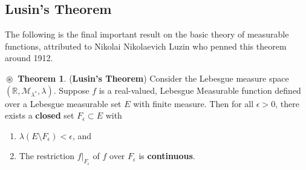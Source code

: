 \documentclass{article}
\theoremstyle{definition}
\newtheorem{theorem}{$\boxed{\boxed{\circledast}}$ Theorem}
\theoremstyle{remark}
\theoremstyle{definition}
\theoremstyle{definition}
\theoremstyle{definition}
\newcommand{\R}{\mathbb{R}}
\newcommand{\set}[1]{\mathscr{#1}}
\newcommand{\msigm}[1]{\set{M}_{#1}}
\newcommand{\lm}[1]{\lambda\left (#1\right )}
\newcommand{\restrict}[2]{\left . #1 \right \vert_{#2}}
\begin{document}
\subsection{Lusin's Theorem}
The following is the final important result on the basic theory of measurable functions, attributed to Nikolai Nikolaevich Luzin who penned this theorem around 1912.
\begin{theorem}
	(\textbf{Lusin's Theorem}) Consider the Lebesgue measure space $ (\R,\msigm{\lambda^*}, \lambda) $. Suppose $ f $ is a real-valued, Lebesgue Measurable function defined over a Lebesgue measurable set $ E $ with finite measure. Then for all $ \epsilon > 0 $, there exists a \textbf{closed} set $ F_{\epsilon} \subset E$ with 
	\begin{enumerate}
		\item {$ \lm{E\setminus F_{\epsilon}} < \epsilon $, and}
		\item {The restriction $ \restrict{f}{F_{\epsilon}} $ of $ f $ over $ F_{\epsilon} $ is \textbf{continuous}.}
	\end{enumerate}
\end{theorem}
\end{document}
